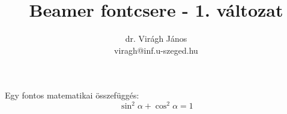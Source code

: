 \documentclass[12pt, xcolor=dvipsnames,svgnames,x11names]{beamer}
\author[Virágh János]{dr. Virágh János \\ viragh@inf.u-szeged.hu}
\title{Beamer fontcsere - 1. változat}
\institute[SZTE]{SZTE-TTIK Számítógépes Optimalizálás Tanszék}
\begin{document}
\begin{frame}[plain]
 \titlepage
\end{frame}
\begin{frame}
\hulipsum[1]
\end{frame}
\begin{frame}
Egy fontos matematikai összefüggés:
\[
\sin^2 \alpha + \cos^2 \alpha = 1
\]
\end{frame}
\end{document}
